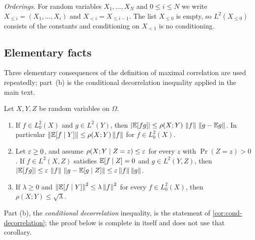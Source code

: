 \emph{Orderings.} For random variables $X_1,\dots,X_N$ and $0\le i\le N$ we
write $X_{\le i}=(X_1,\dots,X_i)$ and $X_{<i}=X_{\le i-1}$. The list
$X_{\le0}$ is empty, so $L^2(X_{\le0})$ consists of the constants and
conditioning on $X_{<1}$ is no conditioning.

\subsection{Elementary facts}

Three elementary consequences of the definition of maximal
correlation are used repeatedly; part~(b) is the conditional
decorrelation inequality applied in the main text.

\begin{lemma}\label{lem:peyre:basic}
Let $X,Y,Z$ be random variables on $\Omega$.
\begin{enumerate}[label=(\alph*)]
\item If $f\in L^2_0(X)$ and $g\in L^2(Y)$, then
  $|\mathbb E[fg]|\le\rho(X;Y)\,\left\|f\right\|\,\left\|g-\mathbb E g\right\|$. In particular
  $\left\|\mathbb E[f\mid Y]\right\|\le\rho(X;Y)\left\|f\right\|$ for $f\in L^2_0(X)$.
\item Let $\varepsilon\ge0$, and assume $\rho(X;Y\mid Z=z)\le\varepsilon$ for every $z$
  with $\Pr(Z=z)>0$. If $f\in L^2(X,Z)$ satisfies $\mathbb E[f\mid Z]=0$ and
  $g\in L^2(Y,Z)$, then
  $|\mathbb E[fg]|\le\varepsilon\,\left\|f\right\|\,\left\|g-\mathbb E[g\mid Z]\right\|\le\varepsilon\left\|f\right\|\left\|g\right\|$.
\item If $\lambda\ge0$ and $\left\|\mathbb E[f\mid Y]\right\|^2\le\lambda\left\|f\right\|^2$ for every
  $f\in L^2_0(X)$, then $\rho(X;Y)\le\sqrt\lambda$.
\end{enumerate}
\end{lemma}

\noindent Part (b), the \emph{conditional decorrelation} inequality, is the
statement of \cref{cor:cond-decorrelation}; the proof below is complete in
itself and does not use that corollary.

